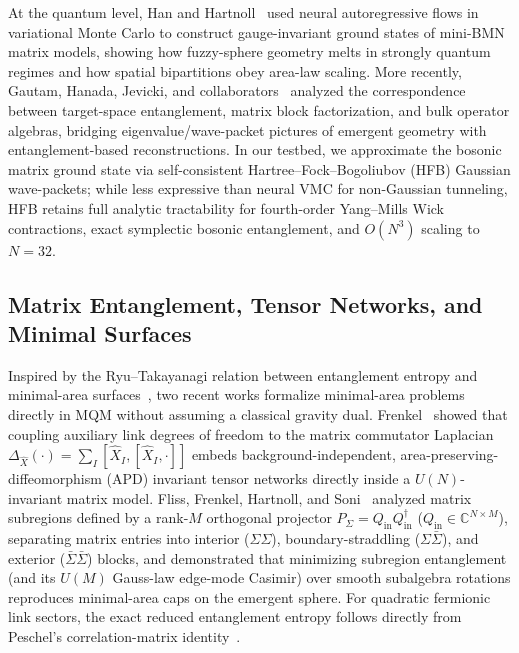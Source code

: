 \documentclass[11pt,a4paper]{article}
\begin{document}
At the quantum level, Han and Hartnoll~\cite{Han2020} used neural autoregressive flows in variational Monte Carlo to construct gauge-invariant ground states of mini-BMN matrix models, showing how fuzzy-sphere geometry melts in strongly quantum regimes and how spatial bipartitions obey area-law scaling. More recently, Gautam, Hanada, Jevicki, and collaborators~\cite{Gautam2022,Gautam2025} analyzed the correspondence between target-space entanglement, matrix block factorization, and bulk operator algebras, bridging eigenvalue/wave-packet pictures of emergent geometry with entanglement-based reconstructions. In our testbed, we approximate the bosonic matrix ground state via self-consistent Hartree--Fock--Bogoliubov (HFB) Gaussian wave-packets; while less expressive than neural VMC for non-Gaussian tunneling, HFB retains full analytic tractability for fourth-order Yang--Mills Wick contractions, exact symplectic bosonic entanglement, and $O(N^3)$ scaling to $N=32$.

\subsection{Matrix Entanglement, Tensor Networks, and Minimal Surfaces}
Inspired by the Ryu--Takayanagi relation between entanglement entropy and minimal-area surfaces~\cite{Ryu2006}, two recent works formalize minimal-area problems directly in MQM without assuming a classical gravity dual. Frenkel~\cite{Frenkel2024} showed that coupling auxiliary link degrees of freedom to the matrix commutator Laplacian $\Delta_{\hat{X}}(\cdot) = \sum_I [\hat{X}_I,[\hat{X}_I,\cdot]]$ embeds background-independent, area-preserving-diffeomorphism (APD) invariant tensor networks directly inside a $U(N)$-invariant matrix model. Fliss, Frenkel, Hartnoll, and Soni~\cite{Fliss2025} analyzed matrix subregions defined by a rank-$M$ orthogonal projector $P_\Sigma = Q_{\mathrm{in}} Q_{\mathrm{in}}^\dagger$ ($Q_{\mathrm{in}} \in \mathbb{C}^{N\times M}$), separating matrix entries into interior ($\Sigma\Sigma$), boundary-straddling ($\Sigma\bar{\Sigma}$), and exterior ($\bar{\Sigma}\bar{\Sigma}$) blocks, and demonstrated that minimizing subregion entanglement (and its $U(M)$ Gauss-law edge-mode Casimir) over smooth subalgebra rotations reproduces minimal-area caps on the emergent sphere. For quadratic fermionic link sectors, the exact reduced entanglement entropy follows directly from Peschel's correlation-matrix identity~\cite{Peschel2003}.
\end{document}
